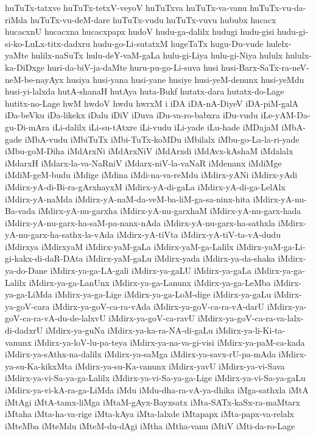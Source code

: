 {huTuTx-tatxve
huTuTx-tetxV-veyoV
huTuTxva
huTuTx-va-vanu
huTuTx-vu-da-riMda
huTuTx-vu-deM-dare
huTuTx-vudu
huTuTx-vuvu
hububx
hucacx
hucacxnU
hucacxna
hucacxpapx
hudoV
hudu-ga-dalilx
hudugi
hudu-gisi
hudu-gi-si-ko-LuLx-titx-dadxru
hudu-go-Li-sutatxM
hugeTaTx
hugu-Du-vude
hulelx-yaMte
hulilx-naSuTx
hulu-deY-vaM-gaLa
hulu-gi-Liya
hulu-gi-Niya
hululx
hululx-ka-DiDxge
huri-da-biV-ja-daMte
huru-pu-go-Li-suva
husi
husi-Barx-SaTx-ra-neV-neM-be-nayAyx
husiya
husi-yana
husi-yane
husiye
husi-yeM-denunx
husi-yeMdu
husi-yi-lalxda
hutA-shanaH
hutAya
huta-Bukf
hutatx-dara
hutatx-do-Lage
hutitx-no-Lage
hwM
hwdoV
hwdu
hwrxM
i
iDA
iDA-nA-DiyeV
iDA-piM-galA
iDa-beVku
iDa-likekx
iDalu
iDiV
iDuva
iDu-va-ro-babxra
iDu-vudu
iLe-yAM-Da-gu-Di-mAra
iLi-dalilx
iLi-su-tAtxre
iLi-vudu
iLi-yade
iLu-hade
iMDajaM
iMbA-gade
iMbA-vudu
iMbiTuTx
iMbi-TuTx-koMDu
iMbilalx
iMbu-go-La-la-ri-yade
iMbu-goM-Diha
iMdArxNi
iMdArxNiV
iMdArxdi
iMdAvx-kAshaM
iMdalalx
iMdarxH
iMdarx-la-va-NaRniV
iMdarx-niV-la-vaNaR
iMdenanx
iMdiMge
iMdiM-geM-budu
iMdige
iMdina
iMdi-na-va-reMdu
iMdirx-yANi
iMdirx-yAdi
iMdirx-yA-di-Bi-ra-gArxhayxM
iMdirx-yA-di-gaLa
iMdirx-yA-di-ga-LelAlx
iMdirx-yA-naMda
iMdirx-yA-naM-da-veM-ba-liM-ga-sa-ninx-hita
iMdirx-yA-nu-Ba-vada
iMdirx-yA-nu-garxha
iMdirx-yA-nu-garxhaM
iMdirx-yA-nu-garx-hada
iMdirx-yA-nu-garx-ha-saM-pa-nanx-nAda
iMdirx-yA-nu-garx-ha-sathxla
iMdirx-yA-nu-garx-ha-sathx-la-vAda
iMdirx-yA-tiVta
iMdirx-yA-tiV-ta-vA-dudu
iMdirxya
iMdirxyaM
iMdirx-yaM-gaLa
iMdirx-yaM-ga-Lalilx
iMdirx-yaM-ga-Li-gi-kakx-di-daR-DAta
iMdirx-yaM-gaLu
iMdirx-yada
iMdirx-ya-da-shaka
iMdirx-ya-do-Dane
iMdirx-ya-ga-LA-gali
iMdirx-ya-gaLU
iMdirx-ya-gaLa
iMdirx-ya-ga-Lalilx
iMdirx-ya-ga-LanUnx
iMdirx-ya-ga-Lanunx
iMdirx-ya-ga-LeMba
iMdirx-ya-ga-LiMda
iMdirx-ya-ga-Lige
iMdirx-ya-ga-LoM-dige
iMdirx-ya-gaLu
iMdirx-ya-goV-cara
iMdirx-ya-goV-ca-ra-vAda
iMdirx-ya-goV-ca-ra-vA-darU
iMdirx-ya-goV-ca-ra-vA-du-de-lalxvU
iMdirx-ya-goV-ca-ravU
iMdirx-ya-goV-ca-ra-va-lalx-di-dadxrU
iMdirx-ya-guNa
iMdirx-ya-ka-ra-NA-di-gaLu
iMdirx-ya-li-Ki-ta-vanunx
iMdirx-ya-loV-lu-pa-teya
iMdirx-ya-na-va-gi-visi
iMdirx-ya-paM-ca-kada
iMdirx-ya-sAthx-na-dalilx
iMdirx-ya-saMga
iMdirx-ya-savx-rU-pa-mAda
iMdirx-ya-su-Ka-kikxMta
iMdirx-ya-su-Ka-vanunx
iMdirx-yavU
iMdirx-ya-vi-Sava
iMdirx-ya-vi-Sa-ya-ga-Lalilx
iMdirx-ya-vi-Sa-ya-ga-Lige
iMdirx-ya-vi-Sa-ya-gaLu
iMdirx-ya-vi-kA-ra-ga-LiMda
iMdu
iMdu-dha-ra-vA-ya-dhika
iMga-sathxla
iMtA
iMtAgi
iMtA-tamx-liMga
iMtaM-gAyx-Bayxsatx
iMta-SATx-kaSx-ra-maMtarx
iMtaha
iMta-ha-va-rige
iMta-kAya
iMta-lalxde
iMtapapx
iMta-papx-va-relalx
iMteMba
iMteMdu
iMteM-du-dAgi
iMtha
iMtha-vanu
iMtiV
iMti-da-ro-Lage
}
